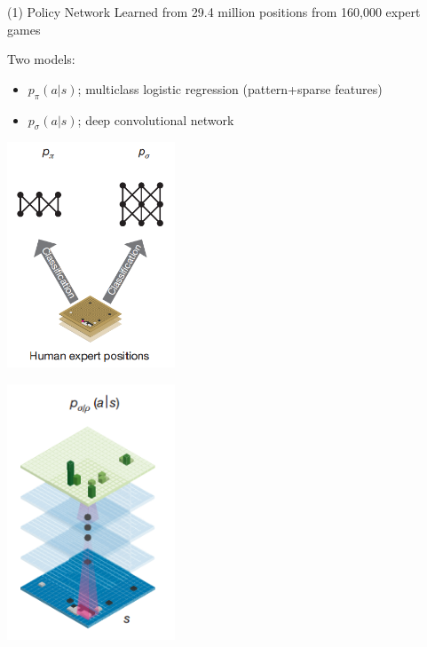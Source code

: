\documentclass{beamer}
\begin{document}
\begin{frame}{(1) Policy Network}
  Learned from 29.4 million positions from 160,000 expert games

  Two models:
  \begin{itemize}
  \item $p_{\pi}(a | s)$; multiclass logistic regression (pattern+sparse features)
  \item $p_{\sigma}(a | s)$; deep convolutional network
  \end{itemize}

  \begin{center}
    \includegraphics[width=5cm]{alphago/sup}
  \end{center}

\end{frame}



\begin{frame}
  \begin{center}
    \includegraphics[width=5cm]{alphago/deepconv}
  \end{center}
\end{frame}
\end{document}
